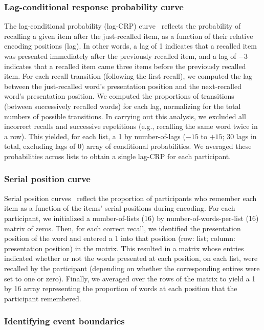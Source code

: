 \documentclass[11pt]{article}
\begin{document}
\subsubsection*{Lag-conditional response probability curve}

The lag-conditional probability (lag-CRP) curve~\citep{Kaha96} reflects the
probability of recalling a given item after the just-recalled item, as a
function of their relative encoding positions (lag). In other words, a lag of 1
indicates that a recalled item was presented immediately after the previously
recalled item, and a lag of $-3$ indicates that a recalled item came three items
before the previously recalled item. For each recall transition (following the
first recall), we computed the lag between the just-recalled word's
presentation position and the next-recalled word's presentation position. We
computed the proportions of transitions (between successively recalled words)
for each lag, normalizing for the total numbers of possible transitions. In
carrying out this analysis, we excluded all incorrect recalls and successive
repetitions (e.g., recalling the same word twice in a row). This yielded, for
each list, a 1 by number-of-lags ($-15$ to $+15$; 30 lags in total, excluding
lags of 0) array of conditional probabilities. We averaged these probabilities
across lists to obtain a single lag-CRP for each participant.



\subsubsection*{Serial position curve}

Serial position curves~\citep{Murd62a} reflect the proportion of participants
who remember each item as a function of the items' serial positions during
encoding. For each participant, we initialized a number-of-lists (16) by
number-of-words-per-list (16) matrix of zeros. Then, for each correct recall,
we identified the presentation position of the word and entered a 1 into that
position (row: list; column: presentation position) in the matrix. This
resulted in a matrix whose entries indicated whether or not the words presented
at each position, on each list, were recalled by the participant (depending on
whether the corresponding entires were set to one or zero). Finally, we
averaged over the rows of the matrix to yield a 1 by 16 array representing the
proportion of words at each position that the participant remembered.

\subsubsection*{Identifying event boundaries}
\end{document}
